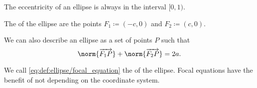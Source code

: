 \begin{definition}
  The eccentricity of an ellipse is always in the interval \( [0, 1) \).

   The  of the ellipse are the points \( F_1 \coloneqq (-c, 0) \) and \( F_2 \coloneqq (c, 0) \).

   We can also describe an ellipse as a set of points \( P \) such that
  \begin{equation}\label{eq:def:ellipse/focal_equation}
    \norm{\vect{F_1 P}} + \norm{\vect{F_2 P}} = 2a.
  \end{equation}

  We call \eqref{eq:def:ellipse/focal_equation} the  of the ellipse. Focal equations have the benefit of not depending on the coordinate system.
\end{definition}
